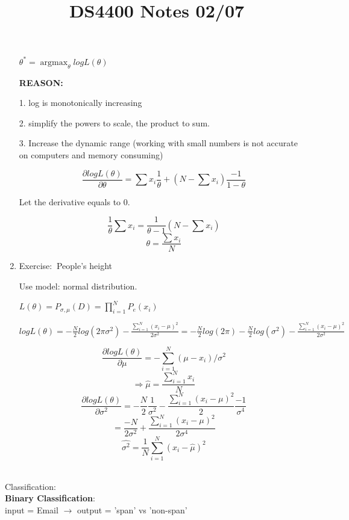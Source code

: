 \documentclass[12pt]{article}
\newcommand{\exe}{{\color{green} Exercise: $\ $}}
\DeclareMathOperator*{\argmax}{\arg\max}
\begin{document}
\begin{enumerate}
            $\theta^* = \argmax_\theta logL(\theta)$

            \textbf{REASON:} 
            
            1. log is monotonically increasing
            
            2. simplify the powers to scale, the product to sum.

            3. Increase the dynamic range (working with small numbers is not accurate on computers and memory consuming)

            $$\frac{\partial log L(\theta)}{\partial \theta} = \sum x_i \frac{1}{\theta} + (N - \sum x_i) \frac{-1}{1-\theta} $$

            Let the derivative equals to 0.

            $$\frac{1}{\theta}\sum x_i = \frac{1}{\theta -1}(N - \sum x_i)$$
            $$\theta = \frac{\sum x_i}{N}$$

            \item \exe People's height
            
            Use model: normal distribution.

            $L(\theta)= P_{\sigma, \mu}(D) = \prod \limits_{i = 1}^{N} P_e(x_i)$

            $logL(\theta) = -\frac{N}{2}log(2\pi\sigma^2) - \frac{\sum\limits_{i = 1}^{N}(x_i-\mu)^2}{2\sigma^2} = -\frac{N}{2}log(2\pi) -\frac{N}{2}log(\sigma^2) - \frac{\sum\limits_{i = 1}^{N}(x_i-\mu)^2}{2\sigma^2}$

            $$\frac{\partial logL(\theta)}{\partial \mu} = -\sum_{i = 1}^N (\mu - x_i)/ \sigma^2$$
            $$\Rightarrow \hat{\mu} =  \frac{\sum\limits_{i = 1}^{N} x_i}{N}$$
            $$\frac{\partial log L(\theta)}{\partial \sigma^2} =-\frac{N}{2}\frac{1}{\sigma^2} - \frac{\sum\limits_{i = 1}^{N}(x_i-\mu)^2}{2} \frac{-1}{\sigma^4}$$
            $$= \frac{-N}{2\sigma^2} + \frac{\sum\limits_{i = 1}^{N}(x_i-\mu)^2}{2\sigma^4}$$
            $$\hat{\sigma^{2}} = \frac{1}{N}\sum_{i = 1}^{N}(x_i - \hat{\mu})^2$$

        \end{enumerate}
        \title{DS4400 Notes 02/07}
        \maketitle\\
        Classification:\\
        \textbf{Binary Classification}:\\
         input = Email $\rightarrow$ output = 'span' vs 'non-span' \\
\end{document}
